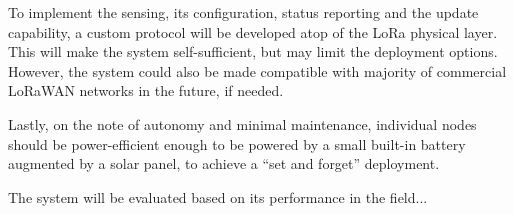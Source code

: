 To implement the sensing, its configuration, status reporting and the update capability, a custom protocol will be developed atop of the LoRa physical layer. This will make the system self-sufficient, but may limit the deployment options. However, the system could also be made compatible with majority of commercial LoRaWAN networks in the future, if needed.

Lastly, on the note of autonomy and minimal maintenance, individual nodes should be power-efficient enough to be powered by a small built-in battery augmented by a solar panel, to achieve a ``set and forget'' deployment.

The system will be evaluated based on its performance in the field...
